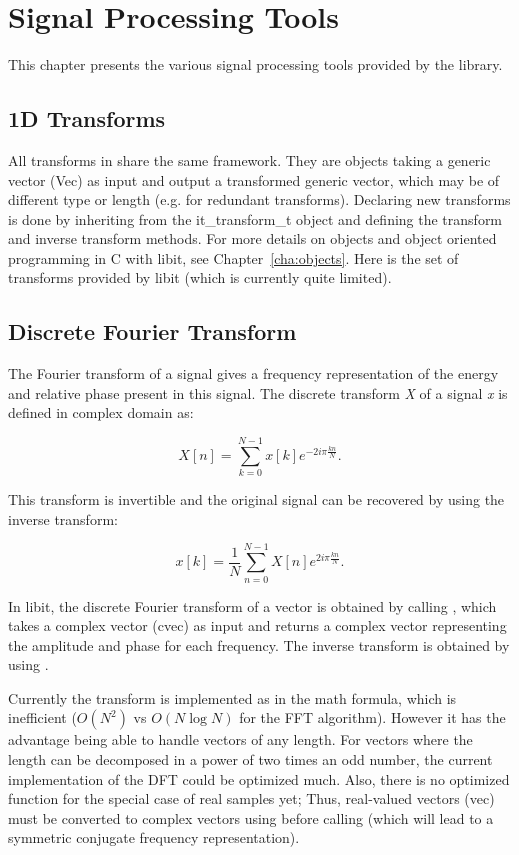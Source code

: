 \chapter{Signal Processing Tools}
\label{cha:signalprocessing}

      This chapter presents the various signal processing tools
  provided by the library.  

\section{1D Transforms}
\label{sec:1dtransforms}

    All transforms in \libit share the same framework. They are
  objects taking a generic vector (Vec) as input and output a
  transformed generic vector, which may be of different type or length
  (e.g. for redundant transforms). Declaring new transforms is done by
  inheriting from the it\_transform\_t object and defining the transform
  and inverse transform methods. For more details on objects and
  object oriented programming in C with libit, see
  Chapter~\ref{cha:objects}. Here is the set of transforms provided by
  libit (which is currently quite limited). 

\section{Discrete Fourier Transform}
\label{sec:dft}

    The Fourier transform of a signal gives a frequency representation
  of the energy and relative phase present in this signal. The
  discrete transform \emph{X} of a signal
  \emph{x} is defined in complex domain as: 

$$
X[n] = \sum\limits_{k=0}^{N-1} x[k] e^{-2i\pi \frac{kn}{N}}.
$$

    This transform is invertible and the original signal can be
    recovered by using the inverse transform:

$$
x[k] = \frac{1}{N} \sum\limits_{n=0}^{N-1} X[n] e^{2i\pi \frac{kn}{N}}.
$$


    In libit, the discrete Fourier transform of a vector is obtained
  by calling , which takes a
  complex vector (cvec) as input and returns a complex vector
  representing the amplitude and phase for each frequency. The inverse
  transform is obtained by using .

    Currently the transform is implemented as in the math formula,
  which is inefficient ($O(N^2)$ vs $O(N \log N)$ for the FFT
  algorithm). However it has the advantage being able to handle
  vectors of any length. For vectors where the length can be
  decomposed in a power of two times an odd number, the current
  implementation of the DFT could be optimized much. Also, there is no
  optimized function for the special case of real samples yet; Thus,
  real-valued vectors (vec) must be converted to complex vectors using
   before calling
   (which will lead to a
  symmetric conjugate frequency representation). 

